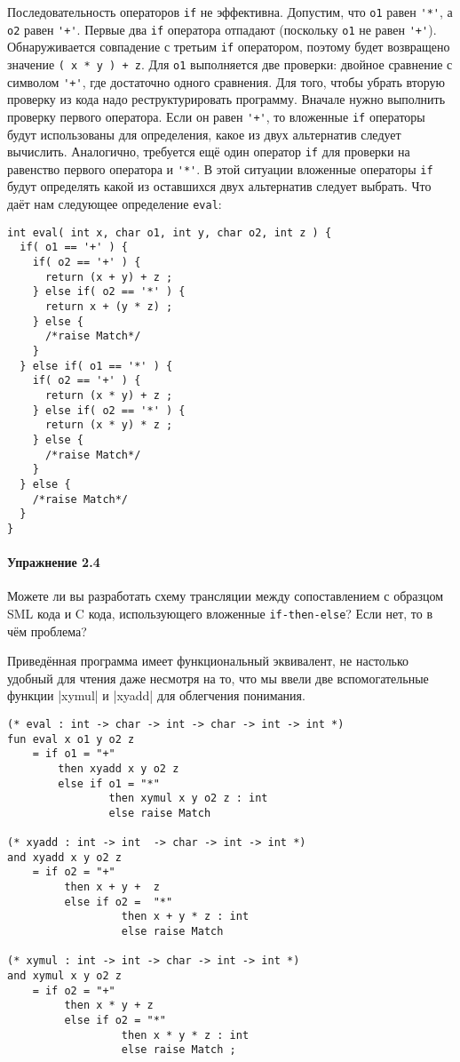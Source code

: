 Последовательность операторов \lstinline|if| не эффективна. Допустим, что \lstinline|o1| равен \lstinline|'*'|, а \lstinline|o2| равен \lstinline|'+'|. Первые два \lstinline|if| оператора отпадают (поскольку \lstinline|o1| не равен \lstinline|'+'|). Обнаруживается совпадение с третьим \lstinline|if| оператором, поэтому будет возвращено значение \lstinline|( x * y ) + z|. Для \lstinline|o1| выполняется две проверки: двойное сравнение с символом \lstinline|'+'|, где достаточно одного сравнения. Для того, чтобы убрать вторую проверку из кода надо реструктурировать программу. Вначале нужно выполнить проверку первого оператора. Если он равен \lstinline|'+'|, то вложенные \lstinline|if| операторы будут использованы для определения, какое из двух альтернатив следует вычислить. Аналогично, требуется ещё один оператор \lstinline|if| для проверки на равенство первого оператора и \lstinline|'*'|. В этой ситуации вложенные операторы \lstinline|if| будут определять какой из оставшихся двух альтернатив следует выбрать. Что даёт нам следующее определение \lstinline|eval|:

\begin{lstlisting}
int eval( int x, char o1, int y, char o2, int z ) {
  if( o1 == '+' ) {
    if( o2 == '+' ) {
      return (x + y) + z ;
    } else if( o2 == '*' ) {
      return x + (y * z) ;
    } else {
      /*raise Match*/
    }
  } else if( o1 == '*' ) {
    if( o2 == '+' ) {
      return (x * y) + z ;
    } else if( o2 == '*' ) {
      return (x * y) * z ;
    } else {
      /*raise Match*/
    }
  } else {
    /*raise Match*/
  }
}
\end{lstlisting}

\paragraph{Упражнение 2.4} Можете ли вы разработать схему трансляции между сопоставлением с образцом SML кода и C кода, использующего вложенные \lstinline|if-then-else|? Если нет, то в чём проблема?

Приведённая программа имеет функциональный эквивалент, не настолько удобный для чтения даже несмотря на то, что мы ввели две вспомогательные функции \inline|xymul| и \inline|xyadd| для облегчения понимания.

\begin{lstlisting}[style=customml]
(* eval : int -> char -> int -> char -> int -> int *)
fun eval x o1 y o2 z
    = if o1 = "+"
        then xyadd x y o2 z
        else if o1 = "*"
                then xymul x y o2 z : int
                else raise Match

(* xyadd : int -> int  -> char -> int -> int *)
and xyadd x y o2 z
    = if o2 = "+"
         then x + y +  z
         else if o2 =  "*"
                  then x + y * z : int
                  else raise Match

(* xymul : int -> int -> char -> int -> int *)
and xymul x y o2 z
    = if o2 = "+"
         then x * y + z
         else if o2 = "*"
                  then x * y * z : int
                  else raise Match ;
\end{lstlisting}

